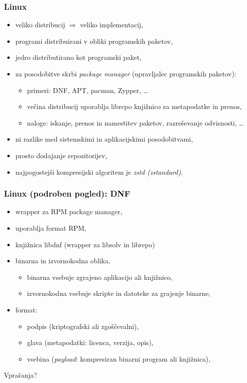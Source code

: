 \documentclass[aspectratio=169]{beamer}
\begin{document}
    \begin{frame}
        \frametitle{Linux}
        \begin{itemize}
            \item veliko distribucij \( \Rightarrow \) veliko implementacij,
            \item programi distribuirani v obliki programskih paketov,
            \item jedro distributirano kot programski paket,
            \item za posodobitve skrbi \emph{package manager} (upravljalec programskih paketov):
            \begin{itemize}
                \item primeri: DNF, APT, pacman, Zypper, \ldots
                \item večina distribucij uporablja librepo knjižnico za metapodatke in prenos,
                \item naloge: iskanje, prenos in namestitev paketov, razreševanje odvisnosti, \ldots
            \end{itemize}
            \item ni razlike med sistemskimi in aplikacijskimi posodobitvami,
            \item prosto dodajanje repozitorijev,
            \item najpogostejši kompresijski algoritem je \emph{zstd (zstandard)}.
        \end{itemize}
    \end{frame}

    \begin{frame}
        \frametitle{Linux (podroben pogled): DNF}
        \begin{itemize}
            \item wrapper za RPM package manager,
            \item uporablja format RPM,
            \item knjižnica libdnf (wrapper za libsolv in librepo)
            \item binarna in izvornokodna oblika,
            \begin{itemize}
                \item binarna vsebuje zgrajeno aplikacijo ali knjižnico,
                \item izvornokodna vsebuje skripte in datoteke za grajenje binarne,
            \end{itemize}
            \item format:
            \begin{itemize}
                \item podpis (kriptografski ali zgoščevalni),
                \item glava (metapodatki: licenca, verzija, opis),
                \item vsebina (\emph{payload}: kompresiran binarni program ali knjižnica),
            \end{itemize}
        \end{itemize}
    \end{frame}

    \begin{frame}[plain,c]
       \begin{center}
            Vprašanja?
       \end{center}
    \end{frame}
\end{document}
